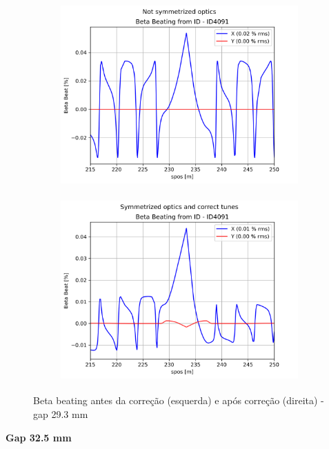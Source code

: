 \documentclass[a4paper,12pt]{article}
\begin{document}
\begin{figure}[H]
\begin{subfigure}{0.5\textwidth}
\includegraphics[width=0.9\linewidth, height=7cm]{figs/phase-16 gap29 uncorrected-optics.png} 
\label{fig:subim1-1629}
\end{subfigure}
\begin{subfigure}{0.5\textwidth}
\includegraphics[width=0.9\linewidth, height=7cm]{figs/phase-16 gap29 corrected-optics-tunes.png}
\label{fig:subim2-1629}
\end{subfigure}
\caption{Beta beating antes da correção (esquerda) e após correção (direita) - gap 29.3 mm}
\label{fig:bb-16_29}
\end{figure}

\textbf{Gap 32.5 mm} \\
\end{document}

